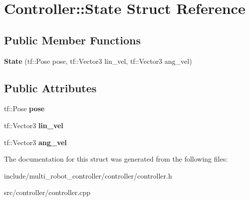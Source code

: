 \hypertarget{structController_1_1State}{}\section{Controller\+:\+:State Struct Reference}
\label{structController_1_1State}
\subsection*{Public Member Functions}
\begin{DoxyCompactItemize}
\item 
\mbox{\label{structController_1_1State_ab75213d196a8198fec43b6737aaac530}} 
{\bfseries State} (tf\+::\+Pose pose, tf\+::\+Vector3 lin\+\_\+vel, tf\+::\+Vector3 ang\+\_\+vel)
\end{DoxyCompactItemize}
\subsection*{Public Attributes}
\begin{DoxyCompactItemize}
\item 
\mbox{\label{structController_1_1State_a9060ab60496abb8a9658646d0f7b8cd4}} 
tf\+::\+Pose {\bfseries pose}
\item 
\mbox{\label{structController_1_1State_acaaf752c2668c1765ae9a653148df694}} 
tf\+::\+Vector3 {\bfseries lin\+\_\+vel}
\item 
\mbox{\label{structController_1_1State_a96665cd4479edd3dd44d27a1f15368dc}} 
tf\+::\+Vector3 {\bfseries ang\+\_\+vel}
\end{DoxyCompactItemize}


The documentation for this struct was generated from the following files\+:\begin{DoxyCompactItemize}
\item 
include/multi\+\_\+robot\+\_\+controller/controller/controller.\+h\item 
src/controller/controller.\+cpp\end{DoxyCompactItemize}
